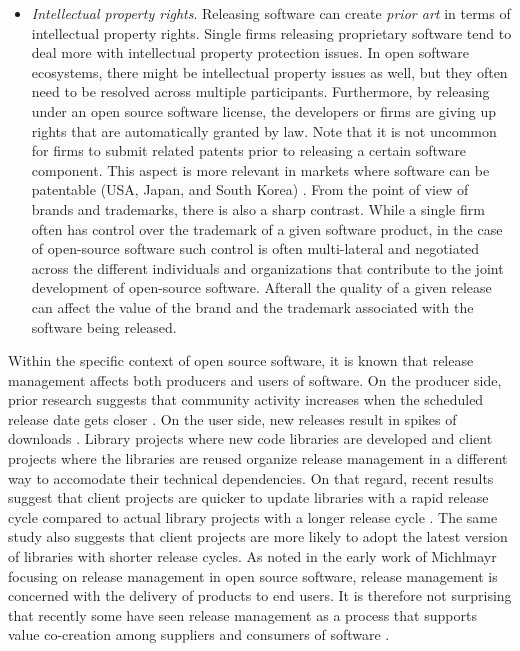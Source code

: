 \documentclass[dvipsnames]{bmcart}
\theoremstyle{definition}
\renewenvironment{newStuff}{}{}
\begin{document}
\begin{itemize}
 \item \textit{Intellectual property rights}. Releasing software can create \textit{prior art} in terms of intellectual property rights. Single firms releasing proprietary software tend to deal more with intellectual property protection issues. In open software ecosystems, there might be intellectual property issues as well, but they often need to be resolved across multiple participants. Furthermore, by releasing under an open source software license, the developers or firms are giving up rights that are automatically granted by law. Note that it is not uncommon for firms to submit related patents prior to releasing a certain software component. This aspect is more relevant in markets where software can be patentable (USA, Japan, and South Korea) \citep{Hall_andMacGarvie2010}. From the point of view of brands and trademarks, there is also a sharp contrast. While a single firm often has control over the trademark of a given software product, in the case of open-source software such control is often multi-lateral and negotiated across the different individuals and organizations that contribute to the joint development of open-source software. Afterall the quality of a given release can affect the value of the brand and the trademark associated with the software being released.  


\end{itemize}

 
Within the specific context of open source software, it is known that release management affects both producers and users of software. On the producer side, prior research suggests that community activity increases when the scheduled release date gets closer \cite{rossi2009analysis}. On the user side,  new releases result in spikes of downloads \cite{wiggins2009heartbeat}. \begin{newStuff}Library projects where new code libraries are developed and client projects where the libraries are reused organize release management in a different way to accomodate their technical dependencies.\end{newStuff} On that regard, recent results  suggest that client projects are quicker to update libraries with a rapid release cycle compared to actual library projects with a longer release cycle \cite{Ihara_et_al2017}.  The same study also suggests that client projects are more likely to adopt the latest version of libraries with shorter release cycles.
As noted in the early work of Michlmayr \cite{Michlmayr07qualityimprovement} focusing on release management in open source software, release management is concerned with the delivery of products to end users. It is therefore not surprising that recently some have seen release management as a process that supports value co-creation among suppliers and consumers of software \cite{cleveland2014orchestrating,barqawi_et_al2016}. 
\end{document}
